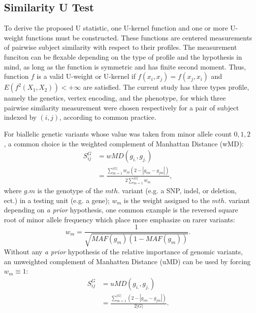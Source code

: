 \documentclass[twocolumn]{article}
\begin{document}
\subsection{Similarity U Test}
  To derive the proposed U statistic, one U-kernel function and one or more U-weight functions must be constructed. These functions are centered measurements of pairwise subject similarity with respect to their profiles. The measurement funciton can be flexable depending on the type of profile and the hypothesis in mind, as long as the function is symmetric and has finite second moment. Thus, function $f$ is a valid U-weight or U-kernel if $f(x_i,x_j)=f(x_j,x_i)$ and $E(f^2(X_1, X_2))<+\infty$ are satisfied. The current study has three types profile, namely the genetics, vertex encoding, and the phenotype, for which three pairwise similarity measurement were chosen respectively for a pair of subject indexed by $(i,j)$, according to common practice.

For biallelic genetic variants whose value was taken from minor allele count ${0, 1, 2}$, a common choice is the weighted complement of Manhattan Distance (wMD):
\begin{equation} \label{eq_wSG}
\begin{split}
  S_{ij}^G &= wMD(g_{i.},g_{j.}) \\
  &= \frac{\sum_{m=1}^{|G|}{w_m(2-|g_{im}-g_{jm}|)}} {2\sum_{m=1}^{|G|}{w_m}},
\end{split}
\end{equation}
where $g.m$ is the genotype of the $m th.$ variant (e.g. a SNP, indel, or deletion, ect.) in a testing unit (e.g. a gene); $w_m$ is the weight assigned to the $m th.$ variant depending on \textit{a prior} hypothesis, one common example is the reversed square root of minor allele frequency which place more emphasize on rarer variants:
\begin{displaymath}w_m=\frac{1}{\sqrt{MAF(g_m)(1-MAF(g_m))}}.\end{displaymath}
Without any \textit{a prior} hypothesis of the relative importance of genomic variants, an unweighted complement of Manhatten Distance (uMD) can be used by forcing $w_m \equiv 1$:
\begin{equation*} \label{eq_uSG}
\begin{split}
  S_{ij}^G &= uMD(g_{i.}, g_{j.}) \\
  &= \frac{\sum_{m = 1}^{|G|}{(2-|g_{im} - g_{jm}|)}}  {2|G|}.
\end{split}
\end{equation*}
\end{document}

